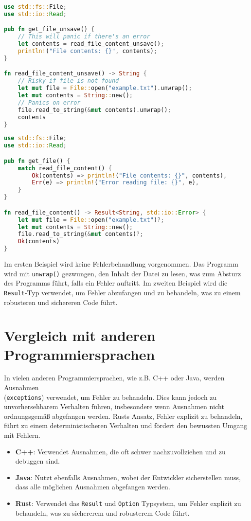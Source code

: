 \begin{lstlisting}[language=Rust, caption=Unsichere Fehlerbehandlung]
use std::fs::File;
use std::io::Read;

pub fn get_file_unsave() {
    // This will panic if there's an error
    let contents = read_file_content_unsave(); 
    println!("File contents: {}", contents);
}

fn read_file_content_unsave() -> String {
    // Risky if file is not found
    let mut file = File::open("example.txt").unwrap();  
    let mut contents = String::new();
    // Panics on error
    file.read_to_string(&mut contents).unwrap();  
    contents
}
\end{lstlisting}
\cleardoublepage
\begin{lstlisting}[language=Rust, caption=Sichere Fehlerbehandlung]
use std::fs::File;
use std::io::Read;

pub fn get_file() {
    match read_file_content() {
        Ok(contents) => println!("File contents: {}", contents),
        Err(e) => println!("Error reading file: {}", e),
    }
}

fn read_file_content() -> Result<String, std::io::Error> {
    let mut file = File::open("example.txt")?;
    let mut contents = String::new();
    file.read_to_string(&mut contents)?;
    Ok(contents)
}
\end{lstlisting}
\noindent
Im ersten Beispiel wird keine Fehlerbehandlung vorgenommen. 
Das Programm wird mit \texttt{unwrap()} gezwungen, den Inhalt der Datei zu lesen, was zum Absturz des Programms führt, falls ein Fehler auftritt. Im zweiten Beispiel wird die \texttt{Result}-Typ verwendet, um Fehler abzufangen und zu behandeln, was zu einem robusteren und sichereren Code führt.

\section{Vergleich mit anderen Programmiersprachen}
In vielen anderen Programmiersprachen, wie z.B. C++ oder Java, werden Ausnahmen \\ (\texttt{exceptions}) verwendet, um Fehler zu behandeln. 
Dies kann jedoch zu unvorhersehbarem Verhalten führen, insbesondere wenn Ausnahmen nicht ordnungsgemäß abgefangen werden. Rusts Ansatz, Fehler explizit zu behandeln, führt zu einem deterministischeren Verhalten und fördert den bewussten Umgang mit Fehlern.

\begin{itemize}
    \item \textbf{C++}: Verwendet Ausnahmen, die oft schwer nachzuvollziehen und zu debuggen sind.
    \item \textbf{Java}: Nutzt ebenfalls Ausnahmen, wobei der Entwickler sicherstellen muss, dass alle möglichen Ausnahmen abgefangen werden.
    \item \textbf{Rust}: Verwendet das \texttt{Result} und \texttt{Option} Typsystem, um Fehler explizit zu behandeln, was zu sichererem und robusterem Code führt.
\end{itemize}

